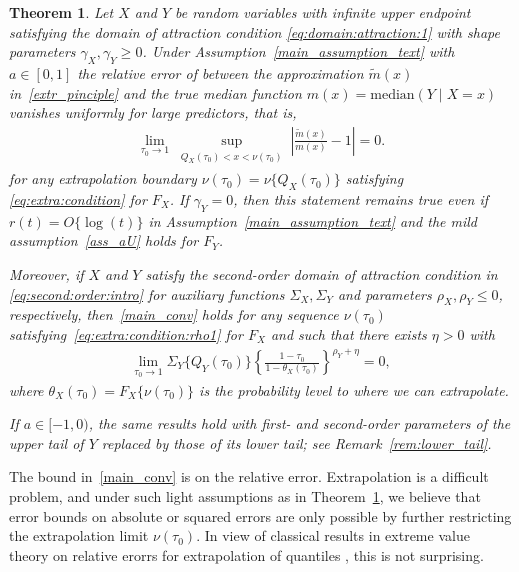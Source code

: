 \documentclass{statsoc}
\newtheorem{theorem}{Theorem}
\theoremstyle{break}
\newcommand{\tauzero}{\tau_0}
\def\M{\text{median}}
\begin{document}
\begin{theorem}\label{thm:main}
	Let $X$ and $Y$ be random variables with infinite upper endpoint satisfying the domain of attraction condition \eqref{eq:domain:attraction:1} 
	with shape parameters $\gamma_X, \gamma_Y \geq 0$. 
	Under Assumption~\ref{main_assumption_text} with $a\in[0,1]$
	the relative error of between the approximation $\tilde m(x)$ in~\eqref{extr_pinciple} and the true median function $m(x) = \M(Y \mid X = x)$  
	vanishes uniformly for large predictors, that is, 
	\begin{align}\label{main_conv}
		\lim_{\tau_0 \to 1} \sup_{
	   \substack{
			Q_X(\tau_0)  < x < \nu(\tau_0) 
				}  } \left|\frac{\tilde m(x)}{ m(x)} - 1 \right| = 0. 
	\end{align}
	for any extrapolation boundary $\nu(\tau_0) = \nu\{ Q_X(\tau_0)\}$ satisfying \eqref{eq:extra:condition} for $F_X$. 
	If $\gamma_Y = 0$, then this statement remains true even if $r(t) = O\{\log(t)\}$ in Assumption~\ref{main_assumption_text} and the mild assumption~\eqref{ass_aU} holds for $F_Y$.

	Moreover, if $X$ and $Y$ satisfy the second-order domain of attraction condition in \eqref{eq:second:order:intro} for auxiliary functions $\Sigma_X, \Sigma_Y$ and parameters $\rho_X, \rho_Y \leq 0$, respectively, then~\eqref{main_conv} holds for any  sequence $\nu(\tau_0)$ satisfying~\eqref{eq:extra:condition:rho1} for $F_X$ and such that there exists $\eta > 0$ with
\begin{align}\label{eq:extra:condition:rho1:thm}
	\lim_{\tau_0 \to 1} \Sigma_Y \{Q_Y(\tau_0) \}\left\{
	\frac{ 1-\tau_0 }{ 1 - \theta_X(\tau_0)} \right\}^{\rho_Y + \eta} = 0,
\end{align}
where $\theta_X(\tau_0) = F_X\{\nu(\tau_0)\}$ is the probability level to where we can extrapolate. 

	If $a\in[-1,0)$, the same results hold with first- and second-order parameters of the upper tail of $Y$ replaced by those of its lower tail; see Remark~\ref{rem:lower_tail}.
\end{theorem}

	The bound in~\eqref{main_conv} is on the relative error. Extrapolation is a difficult problem, and under such light assumptions as in Theorem~\ref{thm:main}, we believe that error bounds on absolute or squared errors are only possible by further restricting the extrapolation limit $\nu(\tauzero)$. In view of classical results in extreme value theory on relative erorrs for extrapolation of quantiles \citep[][Theorem 4.3.1]{dehaan:ferreira:2006}, this is not surprising. 
\end{document}
